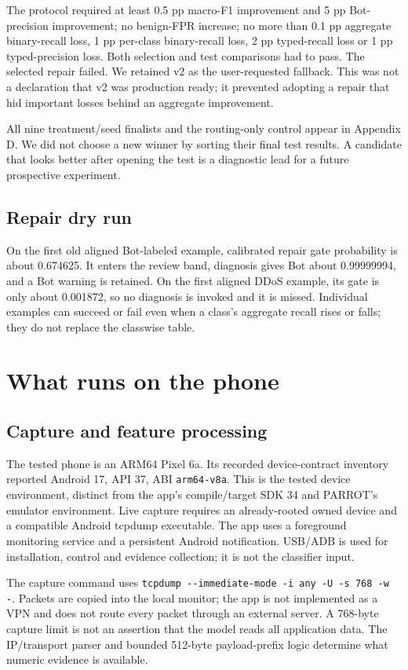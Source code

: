 \documentclass[11pt,a4paper,oneside]{report}
\newcommand{\code}[1]{\nolinkurl{#1}}
\begin{document}
The protocol required at least 0.5 pp macro-F1 improvement and 5 pp Bot-precision improvement; no benign-FPR increase; no more than 0.1 pp aggregate binary-recall loss, 1 pp per-class binary-recall loss, 2 pp typed-recall loss or 1 pp typed-precision loss. Both selection and test comparisons had to pass. The selected repair failed. We retained v2 as the user-requested fallback. This was not a declaration that v2 was production ready; it prevented adopting a repair that hid important losses behind an aggregate improvement.

All nine treatment/seed finalists and the routing-only control appear in Appendix D. We did not choose a new winner by sorting their final test results. A candidate that looks better after opening the test is a diagnostic lead for a future prospective experiment.

\section{Repair dry run}
On the first old aligned Bot-labeled example, calibrated repair gate probability is about 0.674625. It enters the review band, diagnosis gives Bot about 0.99999994, and a Bot warning is retained. On the first aligned DDoS example, its gate is only about 0.001872, so no diagnosis is invoked and it is missed. Individual examples can succeed or fail even when a class's aggregate recall rises or falls; they do not replace the classwise table.

\chapter{What runs on the phone}
\section{Capture and feature processing}
The tested phone is an ARM64 Pixel 6a. Its recorded device-contract inventory reported Android 17, API 37, ABI \code{arm64-v8a}. This is the tested device environment, distinct from the app's compile/target SDK 34 and PARROT's emulator environment. Live capture requires an already-rooted owned device and a compatible Android tcpdump executable. The app uses a foreground monitoring service and a persistent Android notification. USB/ADB is used for installation, control and evidence collection; it is not the classifier input.

The capture command uses \code{tcpdump --immediate-mode -i any -U -s 768 -w -}. Packets are copied into the local monitor; the app is not implemented as a VPN and does not route every packet through an external server. A 768-byte capture limit is not an assertion that the model reads all application data. The IP/transport parser and bounded 512-byte payload-prefix logic determine what numeric evidence is available.
\end{document}

